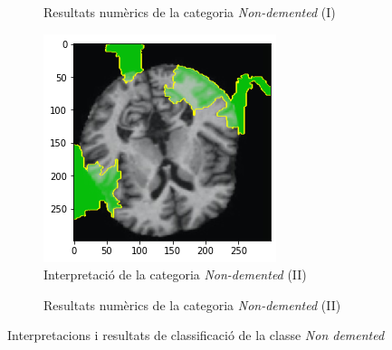 \documentclass[a4paper,12pt]{article}
\begin{document}
\begin{figure}[h!]
\begin{subfigure}[b]{0.40\linewidth}
        \caption{Resultats numèrics de la categoria \textit{Non-demented} (I)}
        \label{fig:ClassificacioND1}
    \end{subfigure}
    \begin{subfigure}[b]{0.40\linewidth}
        \includegraphics[width=\linewidth]{images/Non 2.png}
        \caption{Interpretació de la categoria \textit{Non-demented} (II)}
        \label{fig:ND2}
    \end{subfigure}
    \begin{subfigure}[b]{0.40\linewidth}
        \caption{Resultats numèrics de la categoria \textit{Non-demented} (II)}
        \label{fig:ClassificacioND1}
    \end{subfigure}
    \caption{Interpretacions i resultats de classificació de la classe \textit{Non demented}}
    \label{fig:NDInterpretacions}
\end{figure}
\end{document}
